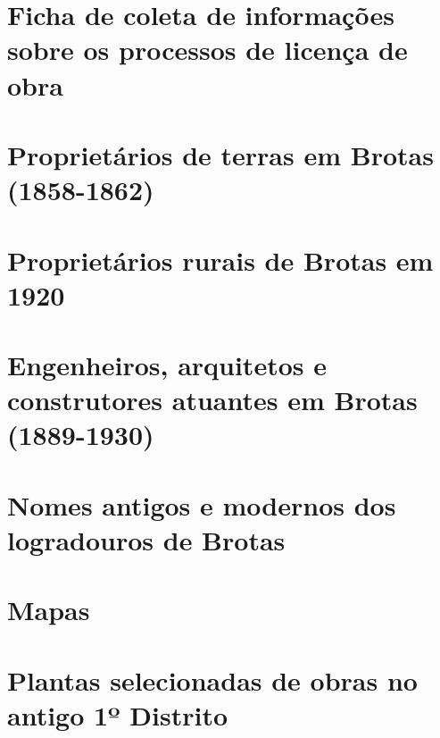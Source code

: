 \begin{anexosenv}

\partanexos
\label{cap:anexos}

\chapter{Ficha de coleta de informações sobre os processos de licença de obra}

\chapter{Proprietários de terras em Brotas (1858-1862)}\label{anexo1}


\chapter{Proprietários rurais de Brotas em 1920}


\chapter{Engenheiros, arquitetos e construtores atuantes em Brotas (1889-1930)}

\afterpage{
\begin{a3paisagem}

\end{a3paisagem}
}

\chapter{Nomes antigos e modernos dos logradouros de Brotas}


\chapter{Mapas}\label{anexo-mapas}



\chapter{Plantas selecionadas de obras no antigo 1º Distrito}


\end{anexosenv}
